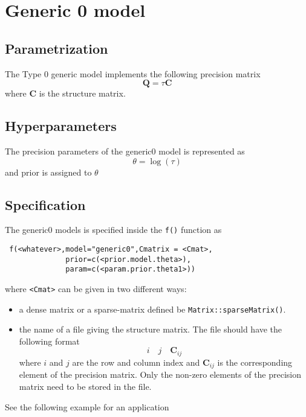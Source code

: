 \documentclass[a4paper,11pt]{article}
\begin{document}
\section*{Generic 0 model}

\subsection*{Parametrization}

The Type 0 generic model implements the following precision matrix
\begin{displaymath}
    \mathbf{Q}=\tau\mathbf{C}
\end{displaymath}
where $\mathbf{C}$ is the structure matrix.

\subsection*{Hyperparameters}

The precision parameters of the generic0 model is represented as
\begin{displaymath}
    \theta = \log(\tau)
\end{displaymath}
and prior is assigned to $\theta$

\subsection*{Specification}

The generic0 models is specified inside the {\tt f()} function as
\begin{verbatim}
 f(<whatever>,model="generic0",Cmatrix = <Cmat>,
              prior=c(<prior.model.theta>),
              param=c(<param.prior.theta1>))
\end{verbatim}


where {\tt <Cmat>} can be given in two different ways:
\begin{itemize}
\item a dense matrix or a sparse-matrix defined be
    \texttt{Matrix::sparseMatrix()}.
\item the name of a file giving the structure matrix. The file should
    have the following format
    \[
    i\quad j\quad \mathbf{C}_{ij}
    \]
    where $i$ and $j$ are the row and column index and
    $\mathbf{C}_{ij}$ is the corresponding element of the precision
    matrix. Only the non-zero elements of the precision matrix need to
    be stored in the file.  
\end{itemize}
See the following example for an application
\end{document}
